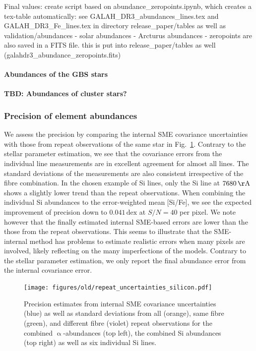 \documentclass[fleqn,usenatbib,useAMS]{mnras}
\begin{document}
Final values: create script based on abundance\_zeropoints.ipynb, which creates a tex-table automatically:
see GALAH\_DR3\_abundances\_lines.tex and GALAH\_DR3\_Fe\_lines.tex in directory release\_paper/tables as well as validation/abundances
- solar abundances
- Arcturus abundances
- zeropoints are also saved in a FITS file. this is put into release\_paper/tables as well (galahdr3\_abundance\_zeropoints.fits)

\paragraph*{Abundances of the GBS stars}

\paragraph*{TBD: Abundances of cluster stars?}

\subsubsection{Precision of element abundances}

We assess the precision by comparing the internal SME covariance uncertainties with those from repeat observations of the same star in Fig.~\ref{fig:precision_ab}. Contrary to the stellar parameter estimation, we see that the covariance errors from the individual line measurements are in excellent agreement for almost all lines. The standard deviations of the measurements are also consistent irrespective of the fibre combination. In the chosen example of Si lines, only the Si line at $7680\,\mathrm{\AA}$  shows a slightly lower trend than the repeat observations. When combining the individual Si abundances to the error-weighted mean [Si/Fe], we see the expected improvement of precision down to $0.041\,\mathrm{dex}$ at $S/N = 40$ per pixel. We note however that the finally estimated internal SME-based errors are lower than the those from the repeat observations. This seems to illustrate that the SME-internal method has problems to estimate realistic errors when many pixels are involved, likely reflecting on the many imperfections of the models. Contrary to the stellar parameter estimation, we only report the final abundance error from the internal covariance error.

\begin{figure}
\centering
\texttt{[image: figures/old/repeat\_uncertainties\_silicon.pdf]}
\caption[{Precision estimates from internal SME covariance for selected element abundances.}]{Precision estimates from internal SME covariance uncertainties (blue) as well as standard deviations from all (orange), same fibre (green), and different fibre (violet) repeat observations for the combined $\upalpha$-abundances (top left), the combined Si abundances (top right) as well as six individual Si lines.}
\label{fig:precision_ab}
\end{figure}
\end{document}

